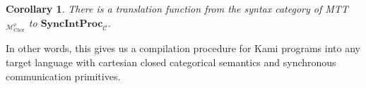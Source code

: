 \documentclass{scrartcl}
\theoremstyle{definition}
\theoremstyle{plain}
\newtheorem{corollary}{Corollary}
\begin{document}
\begin{corollary}
  There is a translation function from the syntax category of
  MTT${}_{\mathcal{M}^\rho_{\textrm{Chor}}}$ to $\textbf{SyncIntProc}_{\mathcal{C}}$.
\end{corollary}
In other words, this gives us a compilation procedure for Kami programs into any
target language with cartesian closed categorical semantics and synchronous communication primitives.





\end{document}
